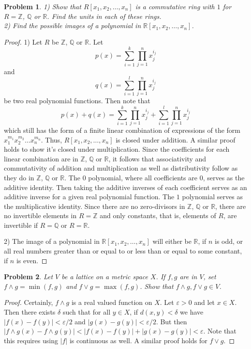 \documentclass{article}
\newtheorem{problem}{Problem}
\begin{document}
\begin{flushleft}
\begin{problem}
1) Show that $R [x_1, x_2, \dots , x_n]$ is a commutative ring with $1$ for $R = \mathbb{Z}$, $\mathbb{Q}$ or $\mathbb{R}$. Find the units in each of these rings.\\
2) Find the possible images of a polynomial in $\mathbb{R} [x_1, x_2, \dots , x_n]$.
\end{problem}
\begin{proof}
1) Let $R$ be $\mathbb{Z}$, $\mathbb{Q}$ or $\mathbb{R}$. Let
\[
p(x) = \sum_{i = 1}^k \prod_{j = 1}^n x_j^{i_j}
\]
and
\[
q(x) = \sum_{i = 1}^l \prod_{j = 1}^n x_j^{i_j}
\]
be two real polynomial functions. Then note that
\[
p(x) + q(x) = \sum_{i = 1}^k \prod_{j = 1}^n x_j^{i_j} + \sum_{i = 1}^l \prod_{j = 1}^n x_j^{i_j}
\]
which still has the form of a finite linear combination of expressions of the form $x_1^{m_1} x_2^{m_2} \dots x_n^{m_n}$. Thus, $R[x_1, x_2, \dots , x_n]$ is closed under addition. A similar proof holds to show it's closed under multiplication. Since the coefficients for each linear combination are in $\mathbb{Z}$, $\mathbb{Q}$ or $\mathbb{R}$, it follows that associativity and commutativity of addition and multiplication as well as distributivity follow as they do in $\mathbb{Z}$, $\mathbb{Q}$ or $\mathbb{R}$. The $0$ polynomial, where all coefficients are $0$, serves as the additive identity. Then taking the additive inverses of each coefficient serves as an additive inverse for a given real polynomial function. The $1$ polynomial serves as the multiplicative identity. Since there are no zero-divisors in $\mathbb{Z}$, $\mathbb{Q}$ or $\mathbb{R}$, there are no invertible elements in $R = \mathbb{Z}$ and only constants, that is, elements of $R$, are invertible if $R = \mathbb{Q}$ or $R = \mathbb{R}$.\newline

2) The image of a polynomial in $\mathbb{R}[x_1, x_2, \dots , x_n]$ will either be $\mathbb{R}$, if $n$ is odd, or all real numbers greater than or equal to or less than or equal to some constant, if $n$ is even.
\end{proof}

\begin{problem}
Let $V$ be a lattice on a metric space $X$. If $f, g$ are in $V$, set $f \wedge g = \min (f,g)$ and $f \vee g = \max (f,g)$. Show that $f \wedge g, f \vee g \in V$.
\end{problem}
\begin{proof}
Certainly, $f \wedge g$ is a real valued function on $X$. Let $\varepsilon > 0$ and let $x \in X$. Then there exists $\delta$ such that for all $y \in X$, if $d(x, y) < \delta$ we have $|f(x) - f(y)| < \varepsilon/2$ and $|g(x) - g(y)| < \varepsilon/2$. But then $|f \wedge g (x) - f \wedge g (y)| < |f(x) - f(y)| + |g(x) - g(y)| < \varepsilon$. Note that this requires using $|f|$ is continuous as well. A similar proof holds for $f \vee g$.
\end{proof}


\end{flushleft}
\end{document}
